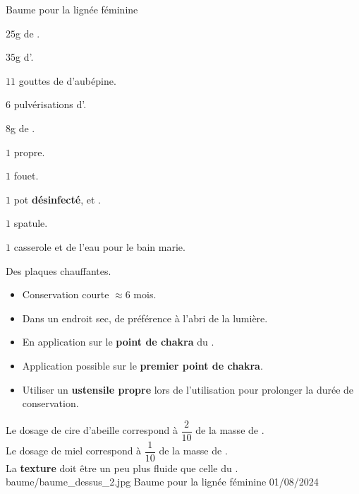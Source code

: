 
\ficherecette
{%
    Baume pour la lignée féminine
}
{%
    \item $25$g de .
    \item $35$g d'.
    \item $11$ gouttes de \teinture d'aubépine.
    \item $6$ pulvérisations d'.
    \item $8$g de .
}
{%
    \item $1$  propre. 
    \item $1$ fouet. 
    \item $1$ pot \textbf{désinfecté},  et .
    \item $1$ spatule. 
    \item $1$ casserole et de l'eau pour le bain marie. 
    \item Des plaques chauffantes.  
}
{%
    \begin{itemize}[label=\faPen]
        \item Conservation courte $\approx 6$ mois.
        \item Dans un endroit sec, de préférence à l'abri de la lumière. 
    \end{itemize}
}
{%
    \begin{itemize}[label=\faPen]
        \item En application sur le \textbf{point de chakra} du .
        \item Application possible sur le \textbf{premier point de chakra}.
        \item Utiliser un \textbf{ustensile propre} lors de l'utilisation pour prolonger la durée de conservation. 
    \end{itemize}
}
{%
    Le dosage de cire d'abeille correspond à $\dfrac{2}{10}$ de la masse de \macerat.\\
    Le dosage de miel correspond à $\dfrac{1}{10}$ de la masse de \macerat.\\
    La \textbf{texture} doit être un peu plus fluide que celle du .
}
{%
    baume/baume_dessus_2.jpg    
}
{%
    Baume pour la lignée féminine
}
{%
    01/08/2024
}